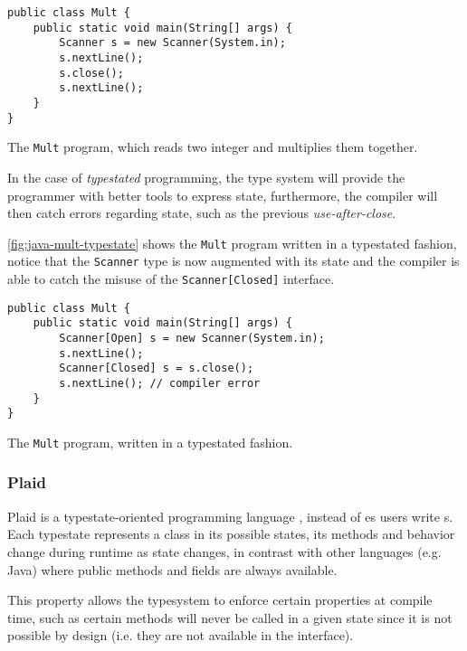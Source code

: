 \begin{listing}
    \centering
    \begin{verbatim}
public class Mult {
    public static void main(String[] args) {
        Scanner s = new Scanner(System.in);
        s.nextLine();
        s.close();
        s.nextLine();
    }
}
    \end{verbatim}
    \caption{The \texttt{Mult} program, which reads two integer and multiplies them together.}
    \label{fig:java-mult}
\end{listing}

In the case of \emph{typestated} programming,
the type system will provide the programmer with better tools to express state,
furthermore, the compiler will then catch errors regarding state,
such as the previous \emph{use-after-close}.

\autoref{fig:java-mult-typestate} shows the \texttt{Mult} program written in a typestated fashion,
notice that the \texttt{Scanner} type is now augmented with its state and
the compiler is able to catch the misuse of the \texttt{Scanner[Closed]} interface.


\begin{listing}
    \centering
    \begin{verbatim}
public class Mult {
    public static void main(String[] args) {
        Scanner[Open] s = new Scanner(System.in);
        s.nextLine();
        Scanner[Closed] s = s.close();
        s.nextLine(); // compiler error
    }
}
    \end{verbatim}
    \caption{The \texttt{Mult} program, written in a typestated fashion.}
    \label{fig:java-mult-typestate}
\end{listing}

\subsubsection*{Plaid}

Plaid is a typestate-oriented programming language \autocite{Aldrich2009},
instead of es users write s.
Each typestate represents a class in its possible states,
its methods and behavior change during runtime as state changes,
in contrast with other languages (e.g. Java) where public methods and fields are always available.

This property allows the typesystem to enforce certain properties at compile time,
such as certain methods will never be called in a given state since it is not possible by design
(i.e. they are not available in the interface).


